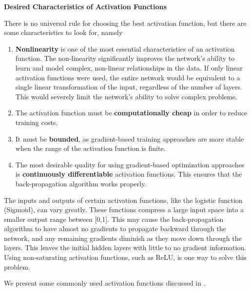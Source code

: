 \documentclass{article}
\begin{document}
\vspace{5mm}
\noindent \textbf{Desired Characteristics of Activation Functions} \citep{jagtap2022important}

\noindent There is no universal rule for choosing the best activation function, but there are some characteristics to look for, namely
\begin{enumerate}
  \item \textbf{Nonlinearity} is one of the most essential characteristics
of an activation function. The non-linearity significantly improves the network's ability to learn and model complex, non-linear relationships in the data. If only linear activation functions were used, the entire network would be equivalent to a single linear transformation of the input, regardless of the number of layers. This would severely limit the network's ability to solve complex problems.

  \item The activation function must
  be \textbf{computationally cheap} in order to reduce training costs.
  \item It must be \textbf{bounded}, as gradient-based training approaches are more stable when the range of the activation function is finite. 
\item The most desirable quality for using
gradient-based optimization approaches is \textbf{continuously
  differentiable} activation functions. This ensures that the
back-propagation algorithm works properly. 
\end{enumerate}
\begin{remark} The inputs and outputs of certain activation functions, like the logistic function (Sigmoid), can vary greatly. These functions compress a large input space into a smaller output range between [0,1]. This may cause the back-propagation algorithm to have almost no gradients to propagate backward through the network, and any remaining gradients diminish as they move down through the layers. This leaves the initial hidden layers with little to no gradient information. Using non-saturating activation functions, such as ReLU, is one way to solve this problem. 
\end{remark}
We present some commonly used activation functions discussed in \cite{jagtap2022important}.
\end{document}
